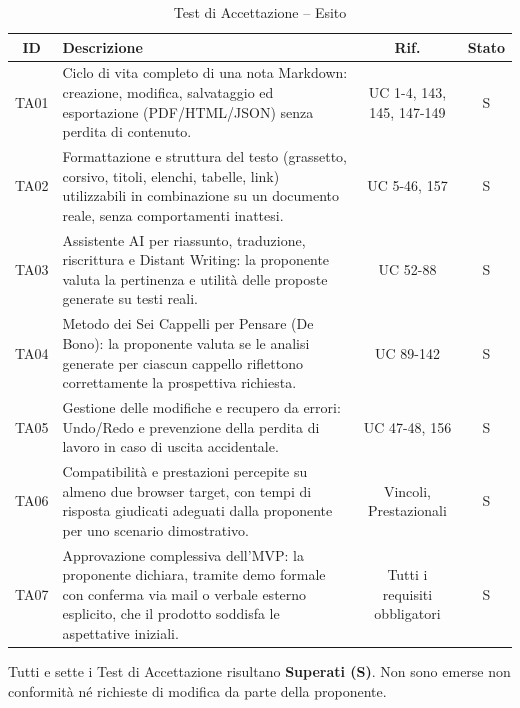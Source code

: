\renewcommand{\arraystretch}{1.3}
\begin{table}[H]
    \centering
    \begin{tabularx}{\textwidth}{|c|X|c|c|}
        \hline
        \rowcolor{primarycolor!10}
        \textbf{ID} & \textbf{Descrizione} & \textbf{Rif.} & \textbf{Stato} \\
        \hline
        TA01 & Ciclo di vita completo di una nota Markdown: creazione, modifica, salvataggio ed esportazione (PDF/HTML/JSON) senza perdita di contenuto. & UC 1-4, 143, 145, 147-149 & S \\
        \hline
        TA02 & Formattazione e struttura del testo (grassetto, corsivo, titoli, elenchi, tabelle, link) utilizzabili in combinazione su un documento reale, senza comportamenti inattesi. & UC 5-46, 157 & S \\
        \hline
        TA03 & Assistente AI per riassunto, traduzione, riscrittura e Distant Writing: la proponente valuta la pertinenza e utilità delle proposte generate su testi reali. & UC 52-88 & S \\
        \hline
        TA04 & Metodo dei Sei Cappelli per Pensare (De Bono): la proponente valuta se le analisi generate per ciascun cappello riflettono correttamente la prospettiva richiesta. & UC 89-142 & S \\
        \hline
        TA05 & Gestione delle modifiche e recupero da errori: Undo/Redo e prevenzione della perdita di lavoro in caso di uscita accidentale. & UC 47-48, 156 & S \\
        \hline
        TA06 & Compatibilità e prestazioni percepite su almeno due browser target, con tempi di risposta giudicati adeguati dalla proponente per uno scenario dimostrativo. & Vincoli, Prestazionali & S \\
        \hline
        TA07 & Approvazione complessiva dell'MVP: la proponente dichiara, tramite demo formale con conferma via mail o verbale esterno esplicito, che il prodotto soddisfa le aspettative iniziali. & Tutti i requisiti obbligatori & S \\
        \hline
    \end{tabularx}
    \caption{Test di Accettazione -- Esito}
    \label{sec:test-accettazione}
\end{table}

Tutti e sette i Test di Accettazione risultano \textbf{Superati (S)}. Non sono emerse non conformità né richieste di modifica da parte della proponente.

\newpage
